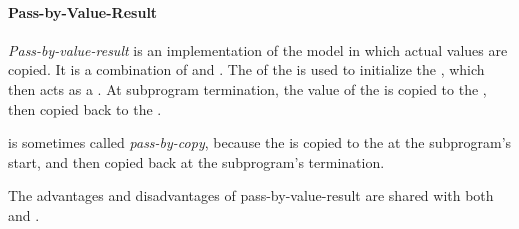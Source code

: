 \paragraph{Pass-by-Value-Result}\label{par:Parameter_Passing-Pass_By_Value_Result}
\begin{definition}\label{def:Pass_By_Value_Result}
  \emph{Pass-by-value-result} is an implementation of the  model in which actual values are copied.
  It is a combination of  and .
  The  of the  is used to initialize the , which then acts as a .
  At subprogram termination, the value of the   is copied to the , then copied back to the .

  \begin{remark}\label{rmk:Pass_By_Copy}
     is sometimes called \emph{pass-by-copy}, because the  is copied to the  at the subprogram's start, and then copied back at the subprogram's termination.
  \end{remark}

  The advantages and disadvantages of pass-by-value-result are shared with both  and .
\end{definition}

